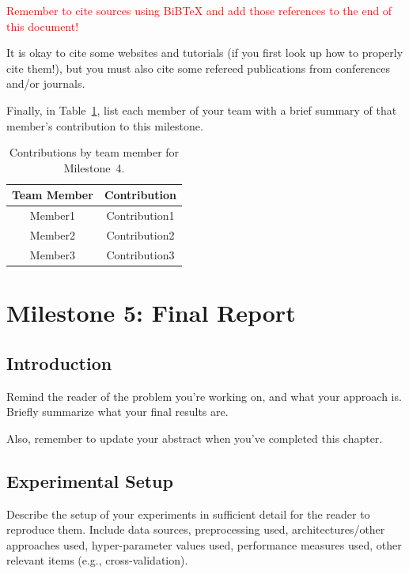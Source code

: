 \documentclass{report}
\begin{document}
\textcolor{red}{Remember to cite sources using BiBTeX and add those references to the end of this document!}

It is okay to cite some websites and tutorials (if you first look up how to properly cite them!), but you must also cite some refereed publications from conferences and/or journals.

Finally, in Table~\ref{tab:contribution4}, list each member of your team with a brief summary of that member's contribution to this milestone.

\begin{table}[]
    \caption{Contributions by team member for Milestone~4.}
    \centering
    \begin{tabular}{|c|c|} \hline
    {\bf Team Member}     &  {\bf Contribution}  \\ \hline
    Member1     &  Contribution1 \\
    Member2     &  Contribution2 \\
    Member3     &  Contribution3 \\ \hline
    \end{tabular}
    \label{tab:contribution4}
\end{table}

\chapter{Milestone 5: Final Report}


\section{Introduction}
\label{sec:M5-intro}

Remind the reader of the problem you're working on, and what your approach is.  Briefly summarize what your final results are.

Also, remember to update your abstract when you've completed this chapter.

\section{Experimental Setup}
\label{sec:M3-setup}

Describe the setup of your experiments  in sufficient detail for the reader to reproduce them.  Include data sources, preprocessing used, architectures/other approaches used, hyper-parameter values used, performance measures used, other relevant items (e.g., cross-validation).
\end{document}
